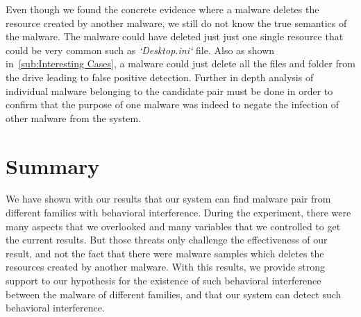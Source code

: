Even though we found the concrete evidence where a malware deletes the resource created by another malware, we still do not know the true semantics of the malware.
The malware could have deleted just just one single resource that could be very common such as \emph{`Desktop.ini`} file.
Also as shown in~\autoref{sub:Interesting Cases}, a malware could just delete all the files and folder from the drive leading to false positive detection.
Further in depth analysis of individual malware belonging to the candidate pair must be done in order to confirm that the purpose of one malware was indeed to negate the infection of other malware from the system.
\section{Summary}
\label{sec:Summary}

We have shown with our results that our system can find malware pair from different families with behavioral interference.
During the experiment, there were  many aspects that we overlooked and many variables that we controlled to get the current results.
But those threats only challenge the effectiveness of our result, and not the fact that there were malware samples which deletes the resources created by another malware.
With this results, we provide strong support to our hypothesis for the existence of such behavioral interference between the malware of different families, and that our system can detect such behavioral interference.

